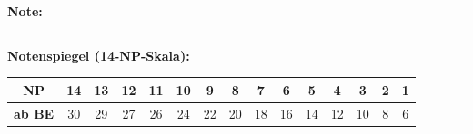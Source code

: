 \documentclass[11pt, a4paper]{article}
\newcommand{\luecke}[1]{\rule{#1}{0.4pt}}
\begin{document}
\vspace{10pt}

\begin{flushright}
\textbf{Note:} \luecke{2cm}
\end{flushright}

\vspace{1em}

\textbf{Notenspiegel (14-NP-Skala):}

\begin{center}
\footnotesize
\begin{tabular}{|c|c|c|c|c|c|c|c|c|c|c|c|c|c|c|}
\hline
\textbf{NP} & 14 & 13 & 12 & 11 & 10 & 9 & 8 & 7 & 6 & 5 & 4 & 3 & 2 & 1 \\
\hline
\textbf{ab BE} & 30 & 29 & 27 & 26 & 24 & 22 & 20 & 18 & 16 & 14 & 12 & 10 & 8 & 6 \\
\hline
\end{tabular}
\end{center}
\end{document}
